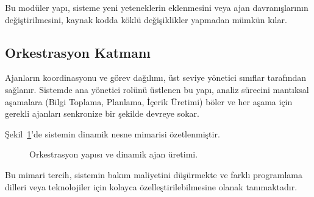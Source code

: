 Bu modüler yapı, sisteme yeni yeteneklerin eklenmesini veya ajan davranışlarının değiştirilmesini, kaynak kodda köklü değişiklikler yapmadan mümkün kılar.

\subsection{Orkestrasyon Katmanı}
Ajanların koordinasyonu ve görev dağılımı, üst seviye yönetici sınıflar tarafından sağlanır. Sistemde ana yönetici rolünü üstlenen bu yapı, analiz sürecini mantıksal aşamalara (Bilgi Toplama, Planlama, İçerik Üretimi) böler ve her aşama için gerekli ajanları senkronize bir şekilde devreye sokar.

Şekil~\ref{fig:class-diagram}'de sistemin dinamik nesne mimarisi özetlenmiştir.

\begin{figure}[H]
    \centering
    \caption{Orkestrasyon yapısı ve dinamik ajan üretimi.}
    \label{fig:class-diagram}
\end{figure}

Bu mimari tercih, sistemin bakım maliyetini düşürmekte ve farklı programlama dilleri veya teknolojiler için kolayca özelleştirilebilmesine olanak tanımaktadır.